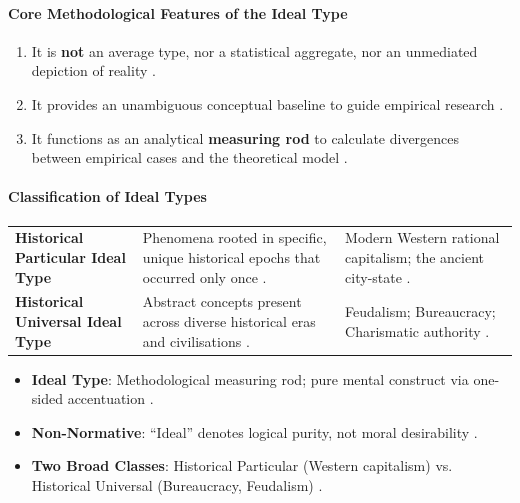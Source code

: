 \paragraph{Core Methodological Features of the Ideal Type}
\begin{enumerate}
    \item It is \textbf{not} an average type, nor a statistical aggregate, nor an unmediated depiction of reality .
    \item It provides an unambiguous conceptual baseline to guide empirical research .
    \item It functions as an analytical \textbf{measuring rod} to calculate divergences between empirical cases and the theoretical model .
\end{enumerate}

\paragraph{Classification of Ideal Types}

\begin{table}[htbp]
\centering
\begin{tabularx}{\textwidth}{p{4cm} Y Y}
\hline
{}
 &  &  \\
\hline
\textbf{Historical Particular Ideal Type} & Phenomena rooted in specific, unique historical epochs that occurred only once . & Modern Western rational capitalism; the ancient city-state . \\
\textbf{Historical Universal Ideal Type} & Abstract concepts present across diverse historical eras and civilisations . & Feudalism; Bureaucracy; Charismatic authority . \\
\hline
\end{tabularx}
\end{table}

\begin{QuickRevision}
\begin{itemize}
    \item \textbf{Ideal Type}: Methodological measuring rod; pure mental construct via one-sided accentuation .
    \item \textbf{Non-Normative}: ``Ideal'' denotes logical purity, not moral desirability .
    \item \textbf{Two Broad Classes}: Historical Particular (Western capitalism) vs. Historical Universal (Bureaucracy, Feudalism) .
\end{itemize}
\end{QuickRevision}

